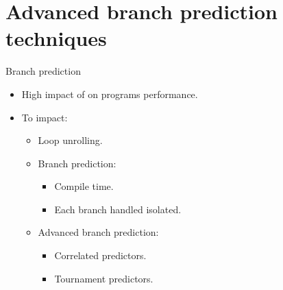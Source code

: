 \section{Advanced branch prediction techniques}

\begin{frame}[t]{Branch prediction}
\begin{itemize}
  \item High impact of  on programs performance.

  \item To  impact:
    \begin{itemize}
      \item Loop unrolling.
      \item Branch prediction:
        \begin{itemize}
          \item Compile time.
          \item Each branch handled isolated.
        \end{itemize}
      \item Advanced branch prediction:
        \begin{itemize}
          \item Correlated predictors.
          \item Tournament predictors.
        \end{itemize}
    \end{itemize}
\end{itemize}
\end{frame}

